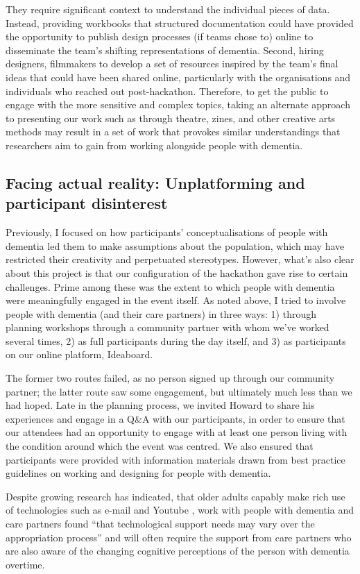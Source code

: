 They require significant context to understand the individual pieces of data. Instead, providing workbooks that structured documentation could have provided the opportunity to publish design processes (if teams chose to) online to disseminate the team’s shifting representations of dementia. Second, hiring designers, filmmakers to develop a set of resources inspired by the team’s final ideas that could have been shared online, particularly with the organisations and individuals who reached out post-hackathon. Therefore, to get the public to engage with the more sensitive and complex topics, taking an alternate approach to presenting our work such as through theatre, zines, and other creative arts methods may result in a set of work that provokes similar understandings that researchers aim to gain from working alongside people with dementia.

\subsection{Facing actual reality: Unplatforming and participant disinterest}
\label{Unplatforming}
Previously, I focused on how participants’ conceptualisations of people with dementia led them to make assumptions about the population, which may have restricted their creativity and perpetuated stereotypes. However, what’s also clear about this project is that our configuration of the hackathon gave rise to certain challenges. Prime among these was the extent to which people with dementia were meaningfully engaged in the event itself. As noted above, I tried to involve people with dementia (and their care partners) in three ways: 1) through planning workshops through a community partner with whom we’ve worked several times, 2) as full participants during the day itself, and 3) as participants on our online platform, Ideaboard. 

The former two routes failed, as no person signed up through our community partner; the latter route saw some engagement, but ultimately much less than we had hoped. Late in the planning process, we invited Howard to share his experiences and engage in a Q\&A with our participants, in order to ensure that our attendees had an opportunity to engage with at least one person living with the condition around which the event was centred. We also ensured that participants were provided with information materials drawn from best practice guidelines on working and designing for people with dementia. 

Despite growing research has indicated, that older adults capably make rich use of technologies such as e-mail and Youtube \citep{sayago_telling_2010,sayago_everyday_2011}, \cite{hwang2020exploring} work with people with dementia and care partners found “that technological support needs may vary over the appropriation process” and will often require the support from care partners who are also aware of the changing cognitive perceptions of the person with dementia overtime. 

